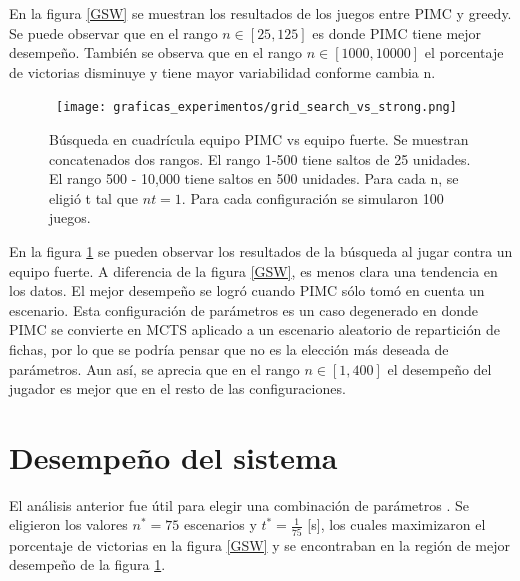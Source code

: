 En la figura \ref{GSW} se muestran los resultados de los juegos entre PIMC y
greedy. Se puede observar que en el rango \( n \in  [25, 125] \) es donde PIMC
tiene mejor desempeño. También se observa que en el rango  \( n \in  [1000,
    10000]\) el porcentaje de victorias disminuye y tiene mayor variabilidad
conforme cambia n.

\begin{figure}[H]
    \begin{center}
        \hbox{\hspace{-2em}
            \texttt{[image: graficas\_experimentos/grid\_search\_vs\_strong.png]}}
        \caption{Búsqueda en cuadrícula equipo PIMC vs equipo fuerte. Se muestran
            concatenados dos rangos. El rango 1-500 tiene saltos de 25 unidades. El
            rango 500 - 10,000 tiene saltos en 500 unidades. Para cada n, se eligió
            t tal que \(nt = 1\). Para cada configuración se simularon 100 juegos.}
        \label{GSS}
    \end{center}
\end{figure}

En la figura \ref{GSS} se pueden observar los resultados de la búsqueda al jugar
contra un equipo fuerte. A diferencia de la figura \ref{GSW}, es menos clara una
tendencia en los datos. El mejor desempeño se logró cuando PIMC sólo tomó en
cuenta un escenario. Esta configuración de parámetros es un caso degenerado en
donde PIMC se convierte en MCTS aplicado a un escenario aleatorio de repartición
de fichas, por lo que se podría pensar que no es la elección más deseada de
parámetros. Aun así, se aprecia que en el rango \( n \in  [1, 400] \) el
desempeño del jugador es mejor que en el resto de las configuraciones.

\section{Desempeño del sistema}

El análisis anterior fue útil para elegir una combinación de parámetros . Se
eligieron los valores \(n^* = 75 \) escenarios y \( t^* = \frac{1}{75}\) [s],
los cuales maximizaron el porcentaje de victorias en la figura \ref{GSW} y se
encontraban en la región de mejor desempeño de la figura \ref{GSS}.

